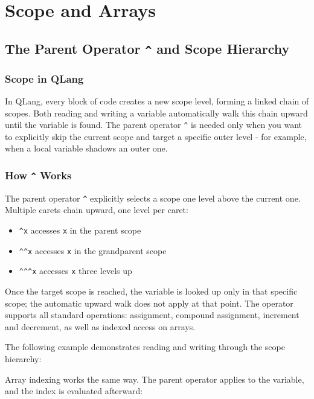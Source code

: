 \section{Scope and Arrays}
\label{sec:scope-and-arrays}

\subsection{The Parent Operator \texttt{\^{}} and Scope Hierarchy}
\label{sec:parent-operator}

\subsubsection{Scope in QLang}
In QLang, every block of code creates a new scope level, forming a linked chain of
scopes. Both reading and writing a variable automatically walk this chain upward
until the variable is found. The parent operator \texttt{\^{}} is needed only when
you want to explicitly skip the current scope and target a specific outer level
- for example, when a local variable shadows an outer one.


\subsubsection{How \texttt{\^{}} Works}
The parent operator \texttt{\^{}} explicitly selects a scope one level above the current
one. Multiple carets chain upward, one level per caret:

\begin{itemize}
    \item \texttt{\^{}x} accesses \texttt{x} in the parent scope
    \item \texttt{\^{}\^{}x} accesses \texttt{x} in the grandparent scope
    \item \texttt{\^{}\^{}\^{}x} accesses \texttt{x} three levels up
\end{itemize}

Once the target scope is reached, the variable is looked up only in that
specific scope; the automatic upward walk does not apply at that point.
The operator supports all standard operations: assignment, compound assignment,
increment and decrement, as well as indexed access on arrays.

The following example demonstrates reading and writing through the scope hierarchy:


\newpage
Array indexing works the same way. The parent operator applies to the variable,
and the index is evaluated afterward:


